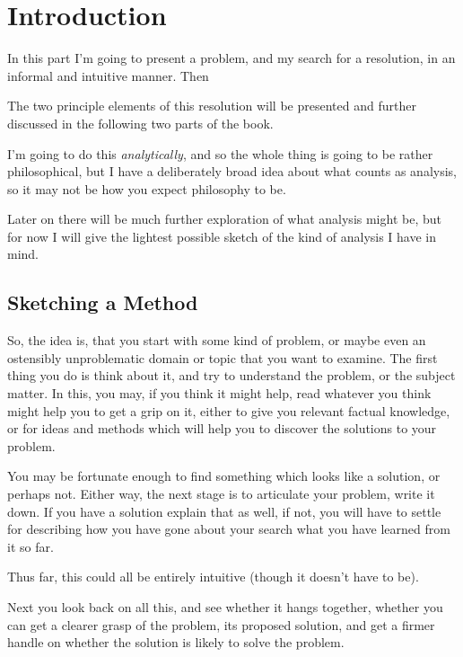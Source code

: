 
\def\rbjidintro{$$Id: intro.tex,v 1.4 2010/02/10 11:17:12 rbj Exp $$}

\chapter{Introduction}\label{Introduction}

In this part I'm going to present a problem, and my search for a resolution, in an informal and intuitive manner.
Then


The two principle elements of this resolution will be presented and further discussed in the following two parts of the book.

I'm going to do this {\it analytically}, and so the whole thing is going to be rather philosophical, but I have a deliberately broad idea about what counts as analysis, so it may not be how you expect philosophy to be.

Later on there will be much further exploration of what analysis might be, but for now I will give the lightest possible sketch of the kind of analysis I have in mind.

\section{Sketching a Method}

So, the idea is, that you start with some kind of problem, or maybe even an ostensibly unproblematic domain or topic that you want to examine.
The first thing you do is think about it, and try to understand the problem, or the subject matter.
In this, you may, if you think it might help, read whatever you think might help you to get a grip on it, either to give you relevant factual knowledge, or for ideas and methods which will help you to discover the solutions to your problem.

You may be fortunate enough to find something which looks like a solution, or perhaps not.
Either way, the next stage is to articulate your problem, write it down.
If you have a solution explain that as well, if not, you will have to settle for describing how you have gone about your search what you have learned from it so far.

Thus far, this could all be entirely intuitive (though it doesn't have to be).

Next you look back on all this, and see whether it hangs together, whether you can get a clearer grasp of the problem, its proposed solution, and get a firmer handle on whether the solution is likely to solve the problem.

